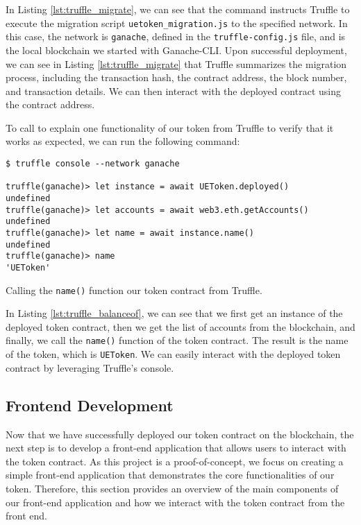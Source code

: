 In Listing \ref{lst:truffle_migrate}, we can see that the command instructs Truffle to execute the migration script \texttt{uetoken\_migration.js}
to the specified network. In this case, the network is \texttt{ganache}, defined in the \texttt{truffle-config.js} file, and is the local
blockchain we started with Ganache-CLI. Upon successful deployment, we can see in Listing \ref{lst:truffle_migrate} that Truffle summarizes the migration
process, including the transaction hash, the contract address, the block number, and transaction details. We can then interact with the deployed contract
using the contract address.

To call to explain one functionality of our token from Truffle to verify that it works as expected, we can run the following command:

\begin{listing}[H]
    \begin{verbatim}
$ truffle console --network ganache

truffle(ganache)> let instance = await UEToken.deployed()
undefined
truffle(ganache)> let accounts = await web3.eth.getAccounts()
undefined
truffle(ganache)> let name = await instance.name()
undefined
truffle(ganache)> name
'UEToken'
    \end{verbatim}
    \caption{Calling the \texttt{name()} function our token contract from Truffle.}
    \label{lst:truffle_balanceof}
\end{listing}

In Listing \ref{lst:truffle_balanceof}, we can see that we first get an instance of the deployed token contract, then we get the list of accounts
from the blockchain, and finally, we call the \texttt{name()} function of the token contract. The result is the name of the token, which is \texttt{UEToken}. We can easily interact with the deployed token contract by leveraging Truffle's console.


\subsection{Frontend Development}
\label{subsec:wallet_frontend}

Now that we have successfully deployed our token contract on the blockchain, the next step is to develop a front-end application that allows users to interact with the token contract. As this project is a proof-of-concept, we focus on creating a simple front-end application that demonstrates the core functionalities of our token. Therefore, this section provides an overview of the main components of our front-end application and how we interact with the token contract from the front end.

